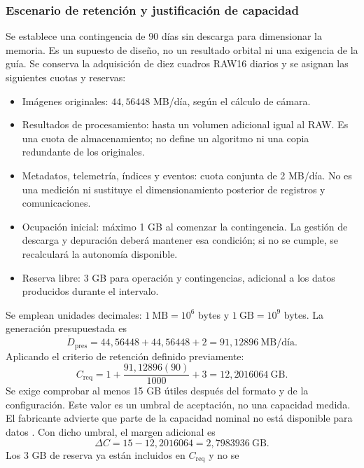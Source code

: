 \documentclass[11pt,letterpaper]{article}
\begin{document}
\subsubsection{Escenario de retención y justificación de capacidad}
Se establece una contingencia de 90 días sin descarga para dimensionar
la memoria. Es un supuesto de diseño, no un resultado orbital ni una
exigencia de la guía. Se conserva la adquisición de diez cuadros RAW16
diarios y se asignan las siguientes cuotas y reservas:
\begin{itemize}
\item Imágenes originales: $44{,}56448$ MB/día, según el cálculo de cámara.
\item Resultados de procesamiento: hasta un volumen adicional igual al
RAW. Es una cuota de almacenamiento; no define un algoritmo ni una
copia redundante de los originales.
\item Metadatos, telemetría, índices y eventos: cuota conjunta de
2 MB/día. No es una medición ni sustituye el dimensionamiento posterior
de registros y comunicaciones.
\item Ocupación inicial: máximo 1 GB al comenzar la contingencia.
La gestión de descarga y depuración deberá mantener esa condición;
si no se cumple, se recalculará la autonomía disponible.
\item Reserva libre: 3 GB para operación y contingencias, adicional
a los datos producidos durante el intervalo.
\end{itemize}
Se emplean unidades decimales: $1\ \mathrm{MB}=10^6$ bytes y
$1\ \mathrm{GB}=10^9$ bytes. La generación presupuestada es
\begin{equation}
\dot D_{\mathrm{pres}}=44{,}56448+44{,}56448+2
=91{,}12896\ \mathrm{MB/día}.
\end{equation}
Aplicando el criterio de retención definido previamente:
\begin{equation}
C_{\mathrm{req}}=1+\frac{91{,}12896(90)}{1000}+3
=12{,}2016064\ \mathrm{GB}.
\end{equation}
Se exige comprobar al menos 15 GB útiles después del formato y de
la configuración. Este valor es un umbral de aceptación, no una
capacidad medida. El fabricante advierte que parte de la capacidad
nominal no está disponible para datos \cite{kingstonsdcit2}.
Con dicho umbral, el margen adicional es
\begin{equation}
\Delta C=15-12{,}2016064=2{,}7983936\ \mathrm{GB}.
\end{equation}
Los 3 GB de reserva ya están incluidos en $C_{\mathrm{req}}$ y no se
\end{document}
